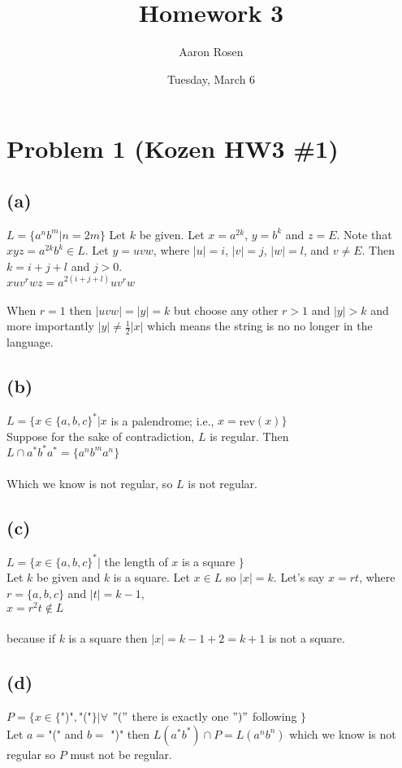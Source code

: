 \documentclass[11pt, a4paper, oneside]{article}
\begin{document}
\title{Homework 3}
\author{Aaron Rosen}
\date{Tuesday, March 6}
\maketitle

\section*{Problem 1 (Kozen HW3 \#1)}
\subsection*{(a)}
$L = \{ a^n b^m | n = 2m\}$
Let $k$ be given. Let $x = a^{2k}$, $y = b^k$ and $z = E$. 
	Note that $xyz = a^{2k} b^k \in L$. Let $y = uvw$, where $|u| = i$, $|v| = j$,
	$|w| = l$, and $v \neq E$. Then $k = i + j + l$ and $j > 0$. \\

$xuv^rwz = a^{2(i+j+l)}uv^rw$\\
\\
When $r = 1$ then $|uvw| = |y| = k$ but choose any other $r > 1$ and $|y| > k$ 
	and more importantly $|y| \neq \frac{1}{2}|x|$ which means the string is no
	no longer in the language.
\subsection*{(b)}
$L = \{x \in \{a, b, c\}^* | x$ is a palendrome; i.e., $x = $rev$(x)\}$\\
Suppose for the sake of contradiction, $L$ is regular. Then \\

$L \cap a^* b^* a^* = \{a^n b^m a^n\}$\\
\\
Which we know is not regular, so $L$ is not regular.
\subsection*{(c)}
$L = \{x \in \{a, b, c\}^* | $ the length of $x$ is a square $\}$\\
Let $k$ be given and $k$ is a square. Let $x \in L$ so $|x| = k$. Let's 
	say $x=rt$, where $r = \{a, b, c\}$ and $|t| = k - 1$,\\

$x = r^2 t \notin L$\\
\\
because if $k$ is a square then $|x| = k - 1 + 2 = k + 1$ is not a square.
\subsection*{(d)}
$P = \{ x \in \{$")"$,$"("$\} | \forall$ $ "("$ there 
	is exactly one $")"$ following $\}$\\
Let $a = $"(" and $b = $ ")" then $L(a^* b^*) \cap P = L(a^n b^n)$ which we know
	is not regular so $P$ must not be regular.
\end{document}
